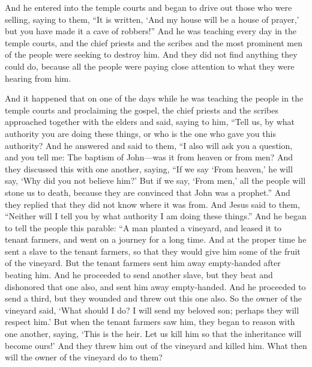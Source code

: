 \begin{biblechapter}
 And he entered into the temple courts and began to drive out those who were selling,
\verse saying to them, “It is written, ‘And my house will be a house of prayer,’ but you have made it a cave of robbers!”
\verse And he was teaching every day in the temple courts, and the chief priests and the scribes and the most prominent men of the people were seeking to destroy him.
\verse And they did not find anything they could do, because all the people were paying close attention to what they were hearing from him.
\end{biblechapter}

\begin{biblechapter} %
 And it happened that on one of the days while he was teaching the people in the temple courts and proclaiming the gospel, the chief priests and the scribes approached together with the elders
\verse and said, saying to him, “Tell us, by what authority you are doing these things, or who is the one who gave you this authority?
\verse And he answered and said to them, “I also will ask you a question, and you tell me:
\verse The baptism of John—was it from heaven or from men?
\verse And they discussed this with one another, saying, “If we say ‘From heaven,’ he will say, ‘Why did you not believe him?’
\verse But if we say, ‘From men,’ all the people will stone us to death, because they are convinced that John was a prophet.”
\verse And they replied that they did not know where it was from.
\verse And Jesus said to them, “Neither will I tell you by what authority I am doing these things.”
 And he began to tell the people this parable: “A man planted a vineyard, and leased it to tenant farmers, and went on a journey for a long time.
\verse And at the proper time he sent a slave to the tenant farmers, so that they would give him some of the fruit of the vineyard. But the tenant farmers sent him away empty-handed after beating him.
\verse And he proceeded to send another slave, but they beat and dishonored that one also, and sent him away empty-handed.
\verse And he proceeded to send a third, but they wounded and threw out this one also.
\verse So the owner of the vineyard said, ‘What should I do? I will send my beloved son; perhaps they will respect him.’
\verse But when the tenant farmers saw him, they began to reason with one another, saying, ‘This is the heir. Let us kill him so that the inheritance will become ours!’
\verse And they threw him out of the vineyard and killed him. What then will the owner of the vineyard do to them?

\end{biblechapter}
